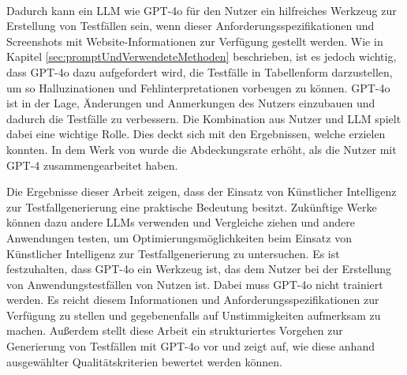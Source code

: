 \documentclass[12pt,toc=bib,toc=listof]{scrreprt}
\begin{document}
\\
Dadurch kann ein LLM wie GPT-4o für den Nutzer ein hilfreiches Werkzeug zur Erstellung von Testfällen sein, wenn dieser Anforderungsspezifikationen und Screenshots mit Website-Informationen zur Verfügung gestellt werden. Wie in Kapitel \ref{sec:promptUndVerwendeteMethoden} beschrieben, ist es jedoch wichtig, dass GPT-4o dazu aufgefordert wird, die Testfälle in Tabellenform darzustellen, um so Halluzinationen und Fehlinterpretationen vorbeugen zu können. GPT-4o ist in der Lage, Änderungen und Anmerkungen des Nutzers einzubauen und dadurch die Testfälle zu verbessern. Die Kombination aus Nutzer und LLM spielt dabei eine wichtige Rolle. Dies deckt sich mit den Ergebnissen, welche \textcite{Kirinuki2024} erzielen konnten. In dem Werk von \textcite{Kirinuki2024} wurde die Abdeckungsrate erhöht, als die Nutzer mit GPT-4 zusammengearbeitet haben.
\newpage

\noindent Die Ergebnisse dieser Arbeit zeigen, dass der Einsatz von Künstlicher Intelligenz zur Testfallgenerierung eine praktische Bedeutung besitzt. Zukünftige Werke können dazu andere LLMs verwenden und Vergleiche ziehen und andere Anwendungen testen, um Optimierungsmöglichkeiten beim Einsatz von Künstlicher Intelligenz zur Testfallgenerierung zu untersuchen. Es ist festzuhalten, dass GPT-4o ein Werkzeug ist, das dem Nutzer bei der Erstellung von Anwendungstestfällen von Nutzen ist. Dabei muss GPT-4o nicht trainiert werden. Es reicht diesem Informationen und Anforderungsspezifikationen zur Verfügung zu stellen und gegebenenfalls auf Unstimmigkeiten aufmerksam zu machen. Außerdem stellt diese Arbeit ein strukturiertes Vorgehen zur Generierung von Testfällen mit GPT-4o vor und zeigt auf, wie diese anhand ausgewählter Qualitätskriterien bewertet werden können.

\printbibliography
\newpage
\end{document}
